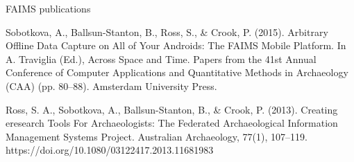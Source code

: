\documentclass[aspectratio=169, 12pt]{beamer} %
\begin{document}
\begin{frame}[allowframebreaks]{FAIMS publications}
{        Sobotkova, A., Ballsun-Stanton, B., Ross, S., \& Crook, P. (2015). Arbitrary Offline Data Capture on All of Your Androids: The FAIMS Mobile Platform. In A. Traviglia (Ed.), Across Space and Time. Papers from the 41st Annual Conference of Computer Applications and Quantitative Methods in Archaeology (CAA) (pp. 80–88). Amsterdam University Press.
        
        Ross, S. A., Sobotkova, A., Ballsun-Stanton, B., \& Crook, P. (2013). Creating eresearch Tools For Archaeologists: The Federated Archaeological Information Management Systems Project. Australian Archaeology, 77(1), 107–119. https://doi.org/10.1080/03122417.2013.11681983
        }
\end{frame}
\end{document}
